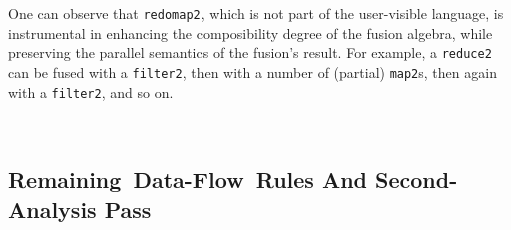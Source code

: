 \documentclass{sigplanconf}  %
\begin{document}

One can observe that {\tt redomap2}, which is not part of the user-visible language, 
is instrumental in enhancing the composibility degree of the fusion algebra, 
while preserving the parallel semantics of the fusion's result. 
For example, a {\tt reduce2} can be fused with a {\tt filter2}, then with a 
number of (partial) {\tt map2}s, then again with a {\tt filter2}, and so on. 
  
$\mbox{ }$\\


\subsection{Remaining~Data-Flow~Rules And Second-Analysis Pass}
\label{sec:bwdPass}
\end{document}

